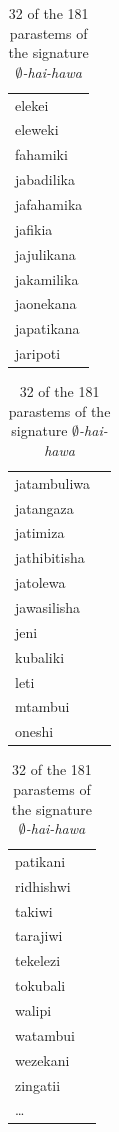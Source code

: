 \documentclass[output=paper,colorlinks,citecolor=brown,
]{langscibook}
\begin{document}
\begin{table}
\begin{minipage}{.24\textwidth}
\begin{tabular}{l}
elekei \\ 
eleweki \\ 
fahamiki \\ 
jabadilika \\ 
jafahamika \\ 
jafikia \\ 
jajulikana \\ 
jakamilika \\ 
jaonekana \\ 
japatikana \\ 
jaripoti \\ 

\end{tabular}
\end{minipage}
\begin{minipage}{.24\textwidth}
\begin{tabular}{ll}
jatambuliwa \\ 
jatangaza \\ 
jatimiza \\ 
jathibitisha \\ 
jatolewa \\ 
jawasilisha \\ 
jeni \\ 
kubaliki \\ 
leti \\ 
mtambui \\ 
oneshi \\ 
\end{tabular}
\end{minipage}
\begin{minipage}{.24\textwidth}
\begin{tabular}{ll}

patikani \\ 
ridhishwi \\
takiwi \\ 
tarajiwi \\ 
tekelezi \\ 
tokubali \\ 
walipi \\ 
watambui \\ 
wezekani \\ 
zingatii \\ 
\ldots 


\end{tabular}
\end{minipage}
\caption{32 of the 181 parastems of the signature \textit{$\emptyset$-hai-hawa}}
\label{negation3}
\end{table}
\end{document}
